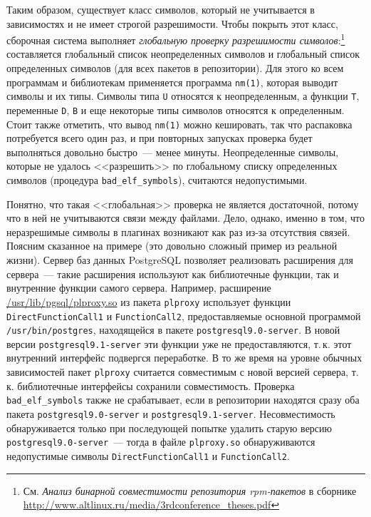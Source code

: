 \documentclass[russian,a4paper,12pt,titlepage]{article}
\begin{document}
Таким образом, существует класс символов, который не учитывается в зависимостях и не имеет строгой разрешимости.
Чтобы покрыть этот класс, сборочная система выполняет \emph{глобальную проверку разрешимости символов}:\footnote{См.
\emph{Анализ бинарной совместимости репозитория rpm-пакетов} в сборнике \url{http://www.altlinux.ru/media/3rdconference_theses.pdf}}
составляется глобальный список неопределенных символов и глобальный список определенных символов (для всех пакетов в репозитории).
Для этого ко всем программам и библиотекам применяется программа \verb|nm(1)|, которая выводит символы и их типы.
Символы типа \verb|U| относятся к неопределенным, а функции \verb|T|, переменные \verb|D|, \verb|B|
и еще некоторые типы символов относятся к определенным.  Стоит также отметить, что вывод \verb|nm(1)| можно кешировать,
так что распаковка потребуется всего один раз, и при повторных запусках проверка будет выполняться довольно быстро~--- менее минуты.
Неопределенные символы, которые не удалось <<разрешить>> по глобальному списку определенных символов
(процедура \verb|bad_elf_symbols|), считаются недопустимыми.

Понятно, что такая <<глобальная>> проверка не является достаточной, потому что в ней не учитываются связи между файлами.
Дело, однако, именно в том, что неразрешимые символы в плагинах возникают как раз из-за отсутствия связей.
Поясним сказанное на примере (это довольно сложный пример из реальной жизни).  Сервер баз данных PostgreSQL позволяет
реализовать расширения для сервера~--- такие расширения используют как библиотечные функции, так и внутренние
функции самого сервера.  Например, расширение \url{/usr/lib/pgsql/plproxy.so} из пакета \verb|plproxy|
использует функции \verb|DirectFunctionCall1| и \verb|FunctionCall2|, предоставляемые основной программой
\verb|/usr/bin/postgres|, находящейся в пакете \verb|postgresql9.0-server|.  В новой версии \verb|postgresql9.1-server|
эти функции уже не предоставляются, т.\,к. этот внутренний интерфейс подвергся переработке.  В то же время на уровне обычных
зависимостей пакет \verb|plproxy| считается совместимым с новой версией сервера, т.\,к. библиотечные интерфейсы сохранили совместимость.
Проверка \verb|bad_elf_symbols| также не срабатывает, если в репозитории находятся сразу оба пакета \verb|postgresql9.0-server|
и \verb|postgresql9.1-server|.  Несовместимость обнаруживается только при последующей попытке удалить старую версию
\verb|postgresql9.0-server|~--- тогда в файле \verb|plproxy.so| обнаруживаются недопустимые символы \verb|DirectFunctionCall1| и \verb|FunctionCall2|.
\end{document}

